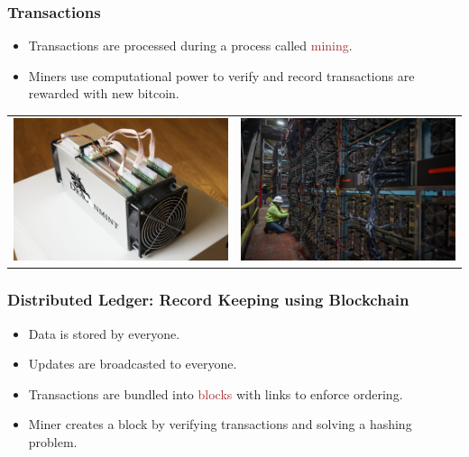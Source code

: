 \documentclass{beamer}
\begin{document}
\begin{frame}
  \frametitle{Transactions}
	\begin{itemize}
		\item Transactions are processed during a process called \textcolor{brown}{mining}.
		\item Miners use computational power to verify and record transactions are rewarded with new bitcoin.
	\end{itemize}
	\centering
	\begin{tabular}{ll}
	\includegraphics[scale=0.15]{dragonmint.jpg} &
	\includegraphics[scale=0.13]{mining.jpg} 
	\end{tabular}
\end{frame}
\begin{frame}
  \frametitle{Distributed Ledger: Record Keeping using Blockchain}
	\begin{itemize}
		\item Data is stored by everyone.
		\item Updates are broadcasted to everyone.
		\item Transactions are bundled into \textcolor{brown}{blocks} with links to enforce ordering.
		\item Miner creates a block by verifying transactions and solving a hashing problem.
	\end{itemize}

\end{frame}
\end{document}
